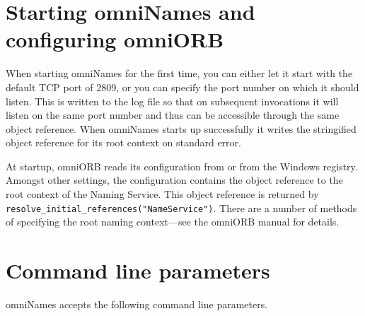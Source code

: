 \documentclass[draft,a4paper,11pt,twoside]{article}
\newcommand{\code}[1]{\texttt{#1}}
\newcommand{\file}{\begingroup \urlstyle{tt}\Url}
\begin{document}
\section{Starting omniNames and configuring omniORB}

When starting omniNames for the first time, you can either let it
start with the default TCP port of 2809, or you can specify the port
number on which it should listen.  This is written to the log file so
that on subsequent invocations it will listen on the same port number
and thus can be accessible through the same object reference.  When
omniNames starts up successfully it writes the stringified object
reference for its root context on standard error.

At startup, omniORB reads its configuration from \file{omniORB.cfg} or
from the Windows registry. Amongst other settings, the configuration
contains the object reference to the root context of the Naming
Service.  This object reference is returned by
\code{resolve\_initial\_references("NameService")}. There are a number
of methods of specifying the root naming context---see the omniORB
manual for details.

\clearpage

\section{Command line parameters}

omniNames accepts the following command line parameters.

\vspace{\baselineskip}
\end{document}
